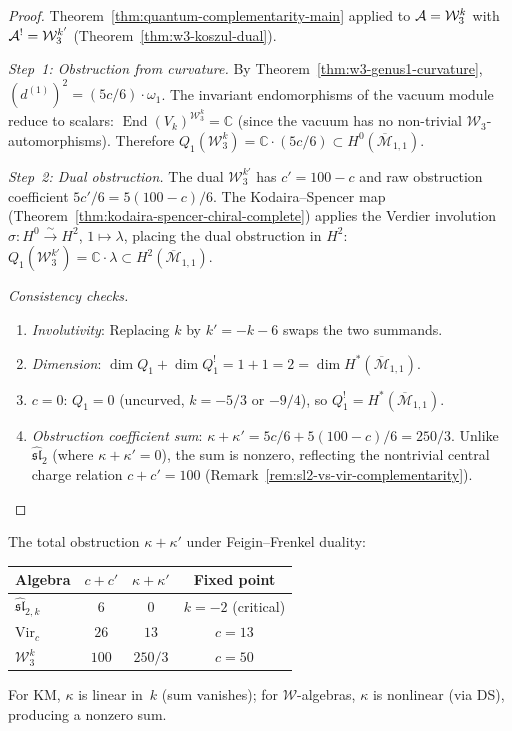 \begin{proof}
Theorem~\ref{thm:quantum-complementarity-main} applied to
$\mathcal{A} = \mathcal{W}_3^k$ with
$\mathcal{A}^! = \mathcal{W}_3^{k'}$
(Theorem~\ref{thm:w3-koszul-dual}).

\emph{Step~1: Obstruction from curvature.}
By Theorem~\ref{thm:w3-genus1-curvature},
$(d^{(1)})^2 = (5c/6) \cdot \omega_1$.  The invariant endomorphisms
of the vacuum module reduce to scalars:
$\operatorname{End}(V_k)^{\mathcal{W}_3^k} = \mathbb{C}$
(since the vacuum has no non-trivial $\mathcal{W}_3$-automorphisms).
Therefore
$Q_1(\mathcal{W}_3^k) = \mathbb{C} \cdot (5c/6) \subset
H^0(\overline{\mathcal{M}}_{1,1})$.

\emph{Step~2: Dual obstruction.}
The dual $\mathcal{W}_3^{k'}$ has $c' = 100 - c$ and raw obstruction
coefficient $5c'/6 = 5(100-c)/6$.  The Kodaira--Spencer map
(Theorem~\ref{thm:kodaira-spencer-chiral-complete}) applies the
Verdier involution $\sigma\colon H^0 \xrightarrow{\sim} H^2$,
$1 \mapsto \lambda$, placing the dual obstruction in $H^2$:
$Q_1(\mathcal{W}_3^{k'}) = \mathbb{C} \cdot \lambda \subset
H^2(\overline{\mathcal{M}}_{1,1})$.

\emph{Consistency checks.}
\begin{enumerate}
\item \emph{Involutivity}: Replacing $k$ by $k' = -k-6$
  swaps the two summands.  \checkmark
\item \emph{Dimension}: $\dim Q_1 + \dim Q_1^! = 1 + 1 = 2 =
  \dim H^*(\overline{\mathcal{M}}_{1,1})$.  \checkmark
\item \emph{$c = 0$}: $Q_1 = 0$ (uncurved, $k = -5/3$ or $-9/4$),
  so $Q_1^! = H^*(\overline{\mathcal{M}}_{1,1})$.  \checkmark
\item \emph{Obstruction coefficient sum}:
  $\kappa + \kappa' = 5c/6 + 5(100-c)/6 = 250/3$.
  Unlike $\widehat{\mathfrak{sl}}_2$ (where $\kappa + \kappa' = 0$),
  the sum is nonzero, reflecting the nontrivial central charge
  relation $c + c' = 100$
  (Remark~\ref{rem:sl2-vs-vir-complementarity}).  \checkmark
\end{enumerate}
\end{proof}

\begin{remark}
\label{rem:w3-kappa-sums}
The total obstruction $\kappa + \kappa'$ under Feigin--Frenkel duality:
\begin{center}
\renewcommand{\arraystretch}{1.3}
\begin{tabular}{lccc}
\toprule
\textbf{Algebra} & $c + c'$ & $\kappa + \kappa'$ & \textbf{Fixed point} \\
\midrule
$\widehat{\mathfrak{sl}}_{2,k}$ & $6$ & $0$ & $k = -2$ (critical) \\
$\mathrm{Vir}_c$ & $26$ & $13$ & $c = 13$ \\
$\mathcal{W}_3^k$ & $100$ & $250/3$ & $c = 50$ \\
\bottomrule
\end{tabular}
\end{center}
For KM, $\kappa$ is linear in~$k$ (sum vanishes); for $\mathcal{W}$-algebras, $\kappa$ is nonlinear (via DS), producing a nonzero sum.
\end{remark}


